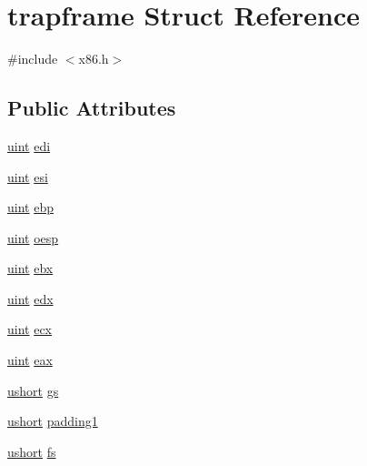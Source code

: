 \hypertarget{structtrapframe}{}\section{trapframe Struct Reference}
\label{structtrapframe}


{\ttfamily \#include $<$x86.\+h$>$}

\subsection*{Public Attributes}
\begin{DoxyCompactItemize}
\item 
\hyperlink{types_8h_a91ad9478d81a7aaf2593e8d9c3d06a14}{uint} \hyperlink{structtrapframe_ad20959553b558987a0d475b6367c87d0}{edi}
\item 
\hyperlink{types_8h_a91ad9478d81a7aaf2593e8d9c3d06a14}{uint} \hyperlink{structtrapframe_a11cbc20a968f2ce7a9b71590a709bb46}{esi}
\item 
\hyperlink{types_8h_a91ad9478d81a7aaf2593e8d9c3d06a14}{uint} \hyperlink{structtrapframe_a258f414f983f95f6799372d548fbd6d3}{ebp}
\item 
\hyperlink{types_8h_a91ad9478d81a7aaf2593e8d9c3d06a14}{uint} \hyperlink{structtrapframe_a8466e7bcbbbe2d19fbe7f4fe0daa29fb}{oesp}
\item 
\hyperlink{types_8h_a91ad9478d81a7aaf2593e8d9c3d06a14}{uint} \hyperlink{structtrapframe_a0f93026966ea52a69a94870fb394ba04}{ebx}
\item 
\hyperlink{types_8h_a91ad9478d81a7aaf2593e8d9c3d06a14}{uint} \hyperlink{structtrapframe_a62585fbda8434a03de564611b89c02ad}{edx}
\item 
\hyperlink{types_8h_a91ad9478d81a7aaf2593e8d9c3d06a14}{uint} \hyperlink{structtrapframe_ad42fe2bbc83c7fe778f0127ac038efa3}{ecx}
\item 
\hyperlink{types_8h_a91ad9478d81a7aaf2593e8d9c3d06a14}{uint} \hyperlink{structtrapframe_ab1dd3a10936b61129d7395c3a21bc2fe}{eax}
\item 
\hyperlink{types_8h_ab95f123a6c9bcfee6a343170ef8c5f69}{ushort} \hyperlink{structtrapframe_a3df62e3ed00405cbaaa4d72902c617da}{gs}
\item 
\hyperlink{types_8h_ab95f123a6c9bcfee6a343170ef8c5f69}{ushort} \hyperlink{structtrapframe_a84a5fbe43d7f11df983d97c80aabb454}{padding1}
\item 
\hyperlink{types_8h_ab95f123a6c9bcfee6a343170ef8c5f69}{ushort} \hyperlink{structtrapframe_a4791a272cca7213d324e59db2d9d0b71}{fs}
\item 

\end{DoxyCompactItemize}
